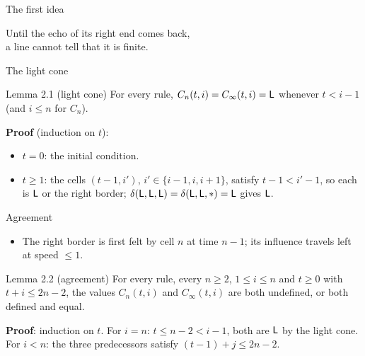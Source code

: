 
\begin{frame}{The first idea}
\begin{center}
\vspace{2ex}
{\Large Until the echo of its right end comes back,\\[0.5ex] a line cannot tell that it is finite.}\\[4ex]
\end{center}
\end{frame}

\begin{frame}{The light cone}
\begin{statement}{Lemma 2.1 (light cone)}
For every rule, $C_n(t,i)=C_\infty(t,i)=\mathsf L$ whenever $t<i-1$ (and $i\le n$ for $C_n$).
\end{statement}
\vspace{2ex}
\textbf{Proof} (induction on $t$):
\begin{itemize}
\item $t=0$: the initial condition.
\item $t\ge1$: the cells $(t-1,i')$, $i'\in\{i-1,i,i+1\}$, satisfy $t-1<i'-1$, so each is $\mathsf L$ or the right border; $\delta(\mathsf L,\mathsf L,\mathsf L)=\delta(\mathsf L,\mathsf L,\ast)=\mathsf L$ gives $\mathsf L$.
\end{itemize}
\end{frame}

\begin{frame}{Agreement}
\begin{itemize}
\item The right border is first felt by cell $n$ at time $n-1$; its influence travels left at speed $\le1$.
\end{itemize}
\vspace{1ex}
\begin{statement}{Lemma 2.2 (agreement)}
For every rule, every $n\ge2$, $1\le i\le n$ and $t\ge0$ with $t+i\le 2n-2$, the values $C_n(t,i)$ and $C_\infty(t,i)$ are both undefined, or both defined and equal.
\end{statement}
\vspace{1ex}
\textbf{Proof}: induction on $t$. For $i=n$: $t\le n-2<i-1$, both are $\mathsf L$ by the light cone. For $i<n$: the three predecessors satisfy $(t-1)+j\le 2n-2$.
\end{frame}

